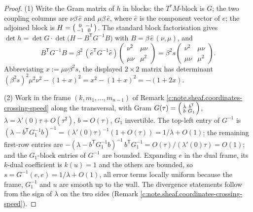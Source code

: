 \documentclass[11pt]{article}
\theoremstyle{definition}
\theoremstyle{plain}
\begin{document}
\begin{proof}
(1) Write the Gram matrix of $h$ in blocks: the $T^*M$-block is $G$; the two coupling columns are $\nu\beta\,\hat e$ and $\mu\beta\,\hat e$, where $\hat e$ is the component vector of $e$; the adjoined block is $H = \begin{psmallmatrix} 0 & -1 \\ -1 & 0\end{psmallmatrix}$. The standard block factorisation gives $\det h = \det G \cdot \det\bigl(H - B^{\mathsf T} G^{-1} B\bigr)$ with $B = \beta\,\hat e\,(\nu, \mu)$, and
\[
B^{\mathsf T} G^{-1} B = \beta^2\, (\hat e^{\mathsf T} G^{-1} \hat e) \begin{pmatrix} \nu^2 & \mu\nu \\ \mu\nu & \mu^2 \end{pmatrix} = \beta^2 s \begin{pmatrix} \nu^2 & \mu\nu \\ \mu\nu & \mu^2 \end{pmatrix}.
\]
Abbreviating $x := \mu\nu\beta^2 s$, the displayed $2 \times 2$ matrix has determinant $(\beta^2 s)^2\mu^2\nu^2 - (1 + x)^2 = x^2 - (1+x)^2 = -(1 + 2x)$.

(2) Work in the frame $(k, m_1, \dots, m_{n-1})$ of Remark \ref{c:note.sheaf.coordinates-crossing-speed} along the transversal, with Gram $G(\tau) = \begin{psmallmatrix} \lambda & b^{\mathsf T} \\ b & G_1 \end{psmallmatrix}$, $\lambda = \lambda'(0)\tau + O(\tau^2)$, $b = O(\tau)$, $G_1$ invertible. The top-left entry of $G^{-1}$ is $(\lambda - b^{\mathsf T} G_1^{-1} b)^{-1} = (\lambda'(0)\tau)^{-1}(1 + O(\tau)) = 1/\lambda + O(1)$; the remaining first-row entries are $-(\lambda - b^{\mathsf T} G_1^{-1} b)^{-1}\, b^{\mathsf T} G_1^{-1} = O(\tau)/(\lambda'(0)\tau) = O(1)$; and the $G_1$-block entries of $G^{-1}$ are bounded. Expanding $e$ in the dual frame, its $k$-dual coefficient is $k(u) = 1$ and the others are bounded, so $s = G^{-1}(e,e) = 1/\lambda + O(1)$, all error terms locally uniform because the frame, $G_1^{-1}$ and $u$ are smooth up to the wall. The divergence statements follow from the sign of $\lambda$ on the two sides (Remark \ref{c:note.sheaf.coordinates-crossing-speed}).

\end{proof}
\end{document}
